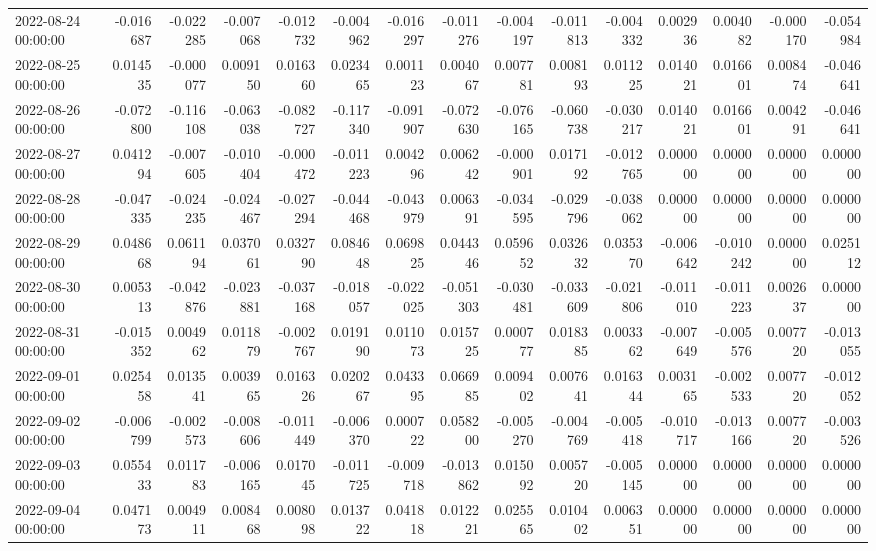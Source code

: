 \begin{tabular}{lrrrrrrrrrrrrrr}
2022-08-24 00:00:00 & -0.016687 & -0.022285 & -0.007068 & -0.012732 & -0.004962 & -0.016297 & -0.011276 & -0.004197 & -0.011813 & -0.004332 & 0.002936 & 0.004082 & -0.000170 & -0.054984 \\
2022-08-25 00:00:00 & 0.014535 & -0.000077 & 0.009150 & 0.016360 & 0.023465 & 0.001123 & 0.004067 & 0.007781 & 0.008193 & 0.011225 & 0.014021 & 0.016601 & 0.008474 & -0.046641 \\
2022-08-26 00:00:00 & -0.072800 & -0.116108 & -0.063038 & -0.082727 & -0.117340 & -0.091907 & -0.072630 & -0.076165 & -0.060738 & -0.030217 & 0.014021 & 0.016601 & 0.004291 & -0.046641 \\
2022-08-27 00:00:00 & 0.041294 & -0.007605 & -0.010404 & -0.000472 & -0.011223 & 0.004296 & 0.006242 & -0.000901 & 0.017192 & -0.012765 & 0.000000 & 0.000000 & 0.000000 & 0.000000 \\
2022-08-28 00:00:00 & -0.047335 & -0.024235 & -0.024467 & -0.027294 & -0.044468 & -0.043979 & 0.006391 & -0.034595 & -0.029796 & -0.038062 & 0.000000 & 0.000000 & 0.000000 & 0.000000 \\
2022-08-29 00:00:00 & 0.048668 & 0.061194 & 0.037061 & 0.032790 & 0.084648 & 0.069825 & 0.044346 & 0.059652 & 0.032632 & 0.035370 & -0.006642 & -0.010242 & 0.000000 & 0.025112 \\
2022-08-30 00:00:00 & 0.005313 & -0.042876 & -0.023881 & -0.037168 & -0.018057 & -0.022025 & -0.051303 & -0.030481 & -0.033609 & -0.021806 & -0.011010 & -0.011223 & 0.002637 & 0.000000 \\
2022-08-31 00:00:00 & -0.015352 & 0.004962 & 0.011879 & -0.002767 & 0.019190 & 0.011073 & 0.015725 & 0.000777 & 0.018385 & 0.003362 & -0.007649 & -0.005576 & 0.007720 & -0.013055 \\
2022-09-01 00:00:00 & 0.025458 & 0.013541 & 0.003965 & 0.016326 & 0.020267 & 0.043395 & 0.066985 & 0.009402 & 0.007641 & 0.016344 & 0.003165 & -0.002533 & 0.007720 & -0.012052 \\
2022-09-02 00:00:00 & -0.006799 & -0.002573 & -0.008606 & -0.011449 & -0.006370 & 0.000722 & 0.058200 & -0.005270 & -0.004769 & -0.005418 & -0.010717 & -0.013166 & 0.007720 & -0.003526 \\
2022-09-03 00:00:00 & 0.055433 & 0.011783 & -0.006165 & 0.017045 & -0.011725 & -0.009718 & -0.013862 & 0.015092 & 0.005720 & -0.005145 & 0.000000 & 0.000000 & 0.000000 & 0.000000 \\
2022-09-04 00:00:00 & 0.047173 & 0.004911 & 0.008468 & 0.008098 & 0.013722 & 0.041818 & 0.012221 & 0.025565 & 0.010402 & 0.006351 & 0.000000 & 0.000000 & 0.000000 & 0.000000 \\

\end{tabular}
